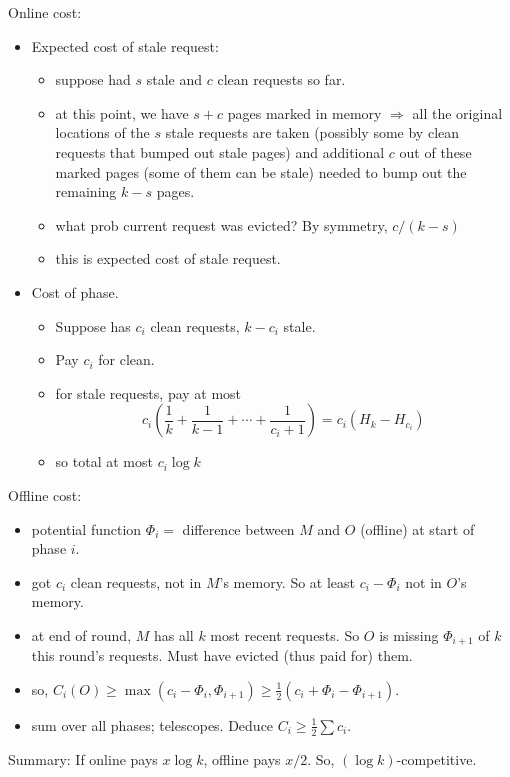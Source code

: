 \documentclass{article}
\begin{document}
Online cost:
\begin{itemize}
\item Expected cost of stale request:
\begin{itemize}
\item suppose had $s$ stale and $c$ clean requests so far.
\item at this point, we have $s+c$ pages marked in memory $\Rightarrow$ all the original locations of the $s$ stale requests are taken (possibly some by clean requests that bumped out stale pages) and additional $c$ out of these marked pages (some of them can be stale) needed to bump out the remaining $k-s$ pages.
\item what prob current request was evicted? By symmetry, $c/(k-s)$
\item this is expected cost of stale request.
\end{itemize}
\item Cost of phase.  
\begin{itemize}
\item Suppose has $c_i$ clean requests, $k-c_i$ stale.
\item Pay $c_i$ for clean.
\item for stale requests, pay at most
\[ 
c_i(\frac1k+\frac1{k-1}+\cdots+\frac{1}{c_i+1})  =c_i(H_k-H_{c_i})
\]
\item so total at most $c_i\log k$
\end{itemize}
\end{itemize}

Offline cost:
\begin{itemize}
\item potential function $\Phi_i=$ difference between $M$ and $O$
  (offline) at start of phase $i$.
\item got $c_i$ clean requests, not in $M$'s memory.  So at least
  $c_i-\Phi_i$ not in $O$'s memory.
\item at end of round, $M$ has all $k$ most recent requests.  So $O$
  is missing $\Phi_{i+1}$ of $k$ this round's requests.  Must have
  evicted (thus paid for) them.
\item so, $C_i(O) \ge \max(c_i-\Phi_i,\Phi_{i+1}) \ge
  \frac12(c_i+\Phi_i-\Phi_{i+1})$.
\item sum over all phases; telescopes.  Deduce $C_i \ge \frac12 \sum
  c_i$.
\end{itemize}

Summary: If online pays $x\log k$, offline pays $x/2$.  So, $(\log
k)$-competitive.  
\end{document}
